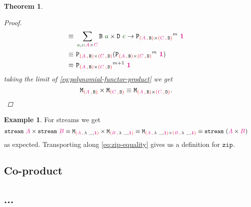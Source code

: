 \documentclass[twoside,11pt,openright]{report}
\theoremstyle{plain} %
\newtheorem{thm}{Theorem}[section]
\theoremstyle{definition}
\newtheorem{exmp}{Example}[section]
\theoremstyle{remark}
\newcommand*{\term}[1]{\textcolor{green!30!black}{#1}} %
\newcommand*{\type}[1]{\textcolor{magenta!90!black}{#1}}
\newcommand*{\containerpair}[2]{\textcolor{red}{(}#1\,\textcolor{red}{,}\,#2\textcolor{red}{)}}
\newcommand*{\unit}{\type{\textbf{1}}}
\newcommand*{\function}[1]{\textcolor{blue!60!black}{\ensuremath{\mathtt{#1}}}}
\newcommand*{\typeformer}[1]{\ensuremath{\mathtt{#1}}}
\newcommand*{\functor}[1]{\ensuremath{\mathbf{\mathtt{#1}}}}
\begin{document}
\begin{thm}
\begin{proof}
\begin{align}
      \equiv&~ \sum_{\term{a} , \term{c} : \type{A} \times \type{C}} \typeformer{B}~\term{a} \times \typeformer{D}~\term{c} \rightarrow {\functor{P}_{\containerpair{\type{A}}{\typeformer{B}} \times \containerpair{\type{C}}{\typeformer{D}}}}^m~\unit \\
      \equiv&~ \functor{P}_{\containerpair{\type{A}}{\typeformer{B}} \times \containerpair{\type{C}}{\typeformer{D}}} ({\functor{P}_{\containerpair{\type{A}}{\typeformer{B}} \times \containerpair{\type{C}}{\typeformer{D}}}}^m~\unit) \\
      \equiv&~ {\functor{P}_{\containerpair{\type{A}}{\typeformer{B}} \times \containerpair{\type{C}}{\typeformer{D}}}}^{m+1}~\unit
    \end{align}
    taking the limit of \eqref{eq:polynomial-functor-product} we get
  \begin{equation}
    \typeformer{M}_{\containerpair{\type{A}}{\typeformer{B}}} \times \typeformer{M}_{\containerpair{\type{C}}{\typeformer{D}}} \equiv \typeformer{M}_{\containerpair{\type{A}}{\typeformer{B}} \times \containerpair{\type{C}}{\typeformer{D}}}.
  \end{equation}
  \end{proof}
\end{thm}
\begin{exmp} For streams we get
\begin{equation}
  \typeformer{stream}~\type{A} \times \typeformer{stream}~\type{B} \equiv \typeformer{M}_{\containerpair{\type{A}}{\lambda~\_,\unit}} \times \typeformer{M}_{\containerpair{\type{B}}{\lambda~\_,\unit}} \equiv \typeformer{M}_{\containerpair{\type{A}}{\lambda~\_,\unit} \times \containerpair{\type{B}}{\lambda~\_,\unit}} \equiv \typeformer{stream}~(\type{A} \times \type{B}) \label{eq:zip-equality}
\end{equation}
as expected. Transporting along \eqref{eq:zip-equality} gives us a definition for \function{zip}.
\end{exmp}

\subsection{Co-product}

\subsection{...}
\end{document}
